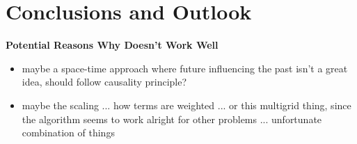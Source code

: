 \documentclass[../draft_1.tex]{subfiles}
\begin{document}
\chapter{Conclusions and Outlook}

\textbf{Potential Reasons Why Doesn't Work Well}

\begin{itemize}
	\item maybe a space-time approach where future influencing the past isn't a great idea, should follow causality principle? 
	\item maybe the scaling ... how terms are weighted ... or this multigrid thing, since the algorithm seems to work alright for other problems ... unfortunate combination of things
\end{itemize}
\end{document}
